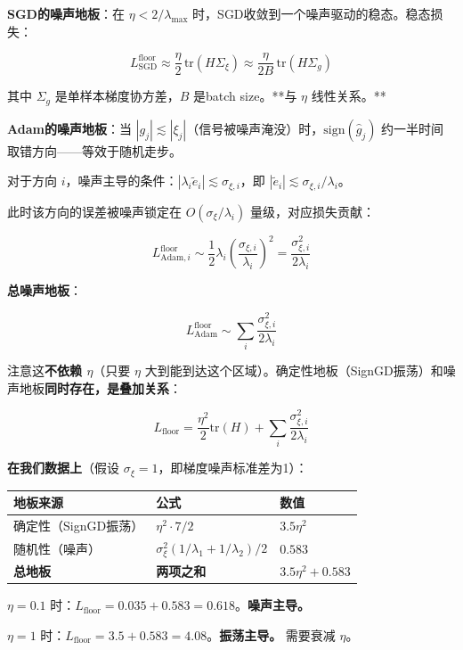 \documentclass[12pt,a4paper]{article}
\begin{document}
\textbf{SGD的噪声地板}：在 $\eta < 2/\lambda_{\max}$ 时，SGD收敛到一个噪声驱动的稳态。稳态损失：


\[L_{\text{SGD}}^{\text{floor}} \approx \frac{\eta}{2}\,\text{tr}(H\Sigma_\xi) \approx \frac{\eta}{2B}\,\text{tr}(H\Sigma_g)\]

其中 $\Sigma_g$ 是单样本梯度协方差，$B$ 是batch size。**与 $\eta$ 线性关系。**

\textbf{Adam的噪声地板}：当 $|g_j| \lesssim |\xi_j|$（信号被噪声淹没）时，$\text{sign}(\hat{g}_j)$ 约一半时间取错方向——等效于随机走步。

对于方向 $i$，噪声主导的条件：$|\lambda_i\tilde{e}_i| \lesssim \sigma_{\xi,i}$，即 $|\tilde{e}_i| \lesssim \sigma_{\xi,i}/\lambda_i$。

此时该方向的误差被噪声锁定在 $O(\sigma_\xi/\lambda_i)$ 量级，对应损失贡献：


\[L_{\text{Adam},i}^{\text{floor}} \sim \frac{1}{2}\lambda_i \left(\frac{\sigma_{\xi,i}}{\lambda_i}\right)^2 = \frac{\sigma_{\xi,i}^2}{2\lambda_i}\]

\textbf{总噪声地板}：


\[L_{\text{Adam}}^{\text{floor}} \sim \sum_i \frac{\sigma_{\xi,i}^2}{2\lambda_i}\]

注意这\textbf{不依赖 $\eta$}（只要 $\eta$ 大到能到达这个区域）。确定性地板（SignGD振荡）和噪声地板\textbf{同时存在，是叠加关系}：

\[L_{\text{floor}} = \frac{\eta^2}{2}\text{tr}(H) + \sum_i \frac{\sigma_{\xi,i}^2}{2\lambda_i}\]

\textbf{在我们数据上}（假设 $\sigma_\xi = 1$，即梯度噪声标准差为1）：





\begin{center}\small
\begin{longtable}{|l|l|l|}
\hline
地板来源 & 公式 & 数值 \\
\hline
确定性（SignGD振荡） & $\eta^2 \cdot 7/2$ & $3.5\eta^2$ \\
随机性（噪声） & $\sigma_\xi^2(1/\lambda_1 + 1/\lambda_2)/2$ & $0.583$ \\
\textbf{总地板} & \textbf{两项之和} & $3.5\eta^2 + 0.583$ \\
\hline
\end{longtable}
\end{center}


$\eta = 0.1$ 时：$L_{\text{floor}} = 0.035 + 0.583 = 0.618$。\textbf{噪声主导。}

$\eta = 1$ 时：$L_{\text{floor}} = 3.5 + 0.583 = 4.08$。\textbf{振荡主导。} 需要衰减 $\eta$。
\end{document}

